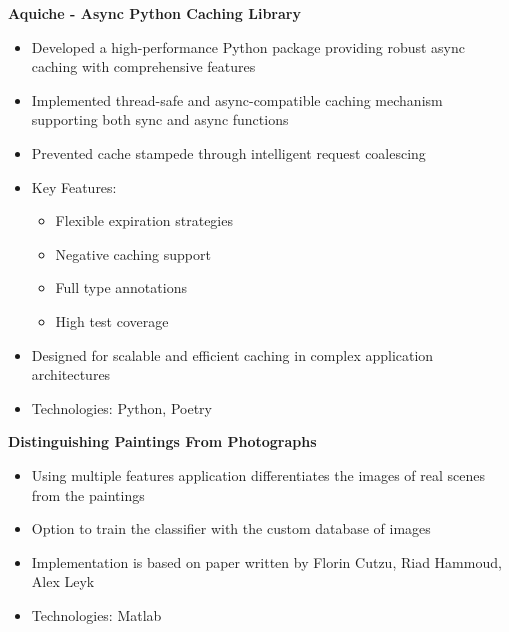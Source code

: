 \documentclass[]{friggeri-cv}
\begin{document}
\textbf{Aquiche - Async Python Caching Library}
\begin{itemize}
  \item Developed a high-performance Python package providing robust async caching with comprehensive features
  \item Implemented thread-safe and async-compatible caching mechanism supporting both sync and async functions
  \item Prevented cache stampede through intelligent request coalescing
  \item Key Features:
    \begin{itemize}
      \item Flexible expiration strategies
      \item Negative caching support
      \item Full type annotations
      \item High test coverage
    \end{itemize}
  \item Designed for scalable and efficient caching in complex application architectures
  \item Technologies: Python, Poetry
\end{itemize}

\textbf{Distinguishing Paintings From Photographs}
\begin{itemize}
  \item Using multiple features application differentiates the images of real scenes from the paintings
  \item Option to train the classifier with the custom database of images
  \item Implementation is based on paper written by Florin Cutzu, Riad Hammoud, Alex Leyk
  \item Technologies: Matlab
\end{itemize}
\end{document}
